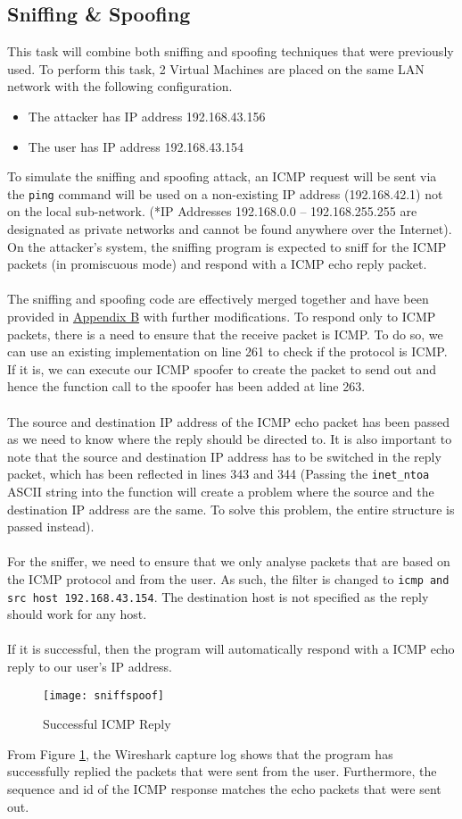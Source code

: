 \documentclass[a4paper,12pt]{article}
\begin{document}
\subsection{Sniffing \& Spoofing}
This task will combine both sniffing and spoofing techniques that were previously used. To perform this task, 2 Virtual Machines are placed on the same LAN network with the following configuration.
\begin{itemize}
\item The attacker has IP address 192.168.43.156
\item The user has IP address 192.168.43.154
\end{itemize}
To simulate the sniffing and spoofing attack, an ICMP request will be sent via the \texttt{ping} command will be used on a non-existing IP address (192.168.42.1) not on the local sub-network. (*IP Addresses 192.168.0.0 -- 192.168.255.255 are designated as private networks and cannot be found anywhere over the Internet). On the attacker's system, the sniffing program is expected to sniff for the ICMP packets (in promiscuous mode) and respond with a ICMP echo reply packet.\\\\The sniffing and spoofing code are effectively merged together and have been provided in \hyperref[ch:SniffSpoof]{Appendix B} with further modifications. To respond only to ICMP packets, there is a need to ensure that the receive packet is ICMP. To do so, we can use an existing implementation on line 261 to check if the protocol is ICMP. If it is, we can execute our ICMP spoofer to create the packet to send out and hence the function call to the spoofer has been added at line 263. \\\\The source and destination IP address of the ICMP echo packet has been passed as we need to know where the reply should be directed to. It is also important to note that the source and destination IP address has to be switched in the reply packet, which has been reflected in lines 343 and 344 (Passing the \texttt{inet\_ntoa} ASCII string into the function will create a problem where the source and the destination IP address are the same. To solve this problem, the entire structure is passed instead).\\\\For the sniffer, we need to ensure that we only analyse packets that are based on the ICMP protocol and from the user. As such, the filter is changed to \texttt{icmp and src host 192.168.43.154}. The destination host is not specified as the reply should work for any host.\\\\If it is successful, then the program will automatically respond with a ICMP echo reply to our user's IP address.
\begin{figure}[H]
\centering
\texttt{[image: sniffspoof]}
\caption{Successful ICMP Reply}
\label{fig:sniffspoof}
\end{figure}
\noindent From Figure \ref{fig:sniffspoof}, the Wireshark capture log shows that the program has successfully replied the packets that were sent from the user. Furthermore, the sequence and id of the ICMP response matches the echo packets that were sent out.
\end{document}

